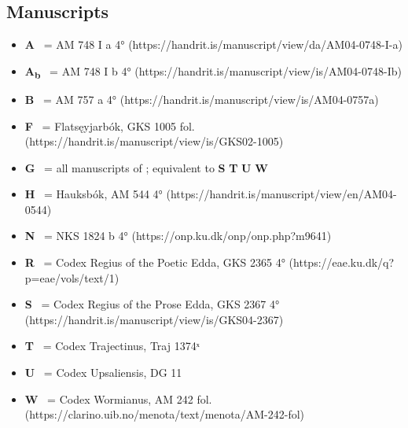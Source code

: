 \newcommand{\AM}{%
	\textbf{A}%
}
\newcommand{\AMb}{%
	\textbf{A\textsubscript{b}}%
}
\newcommand{\EddaBms}{%
	\textbf{B}%
}
\newcommand{\FlatMS}{%
	\textbf{F}%
}
\newcommand{\GylfMS}{%
	\textbf{G}%
}
\newcommand{\Hauksbok}{%
	\textbf{H}%
}
\newcommand{\VolsungaMS}{%
	\textbf{N}%
}
\newcommand{\Regius}{%
	\textbf{R}%
}
\newcommand{\RegiusProse}{%
	\textbf{S}%
}
\newcommand{\Trajectinus}{%
	\textbf{T}%
}
\newcommand{\Wormianus}{%
	\textbf{W}%
}
\newcommand{\Upsaliensis}{%
	\textbf{U}%
}
\newcommand{\HildMS}{%
	ms.%
}

\subsection{Manuscripts}
\begin{itemize}%
	\item \AM\ = AM 748 I a 4° (https://handrit.is/manuscript/view/da/AM04-0748-I-a)
	\item \AMb\ = AM 748 I b 4° (https://handrit.is/manuscript/view/is/AM04-0748-Ib)
	\item \EddaBms\ = AM 757 a 4° (https://handrit.is/manuscript/view/is/AM04-0757a)
	\item \FlatMS\ = Flatsęyjarbók, GKS 1005 fol. (https://handrit.is/manuscript/view/is/GKS02-1005)
	\item \GylfMS\ = all manuscripts of \Gylfaginning; equivalent to \RegiusProse\Trajectinus\Upsaliensis\Wormianus
	\item \Hauksbok\ = Hauksbók, AM 544 4° (https://handrit.is/manuscript/view/en/AM04-0544)
	\item \VolsungaMS\ = NKS 1824 b 4° (https://onp.ku.dk/onp/onp.php?m9641)
	\item \Regius\ = Codex Regius of the Poetic Edda, GKS 2365 4° (https://eae.ku.dk/q?p=eae/vols/text/1)
	\item \RegiusProse\ = Codex Regius of the Prose Edda, GKS 2367 4° (https://handrit.is/manuscript/view/is/GKS04-2367)
	\item \Trajectinus\ = Codex Trajectinus, Traj 1374ˣ
	\item \Upsaliensis\ = Codex Upsaliensis, DG 11
	\item \Wormianus\ = Codex Wormianus, AM 242 fol. (https://clarino.uib.no/menota/text/menota/AM-242-fol)
\end{itemize}

